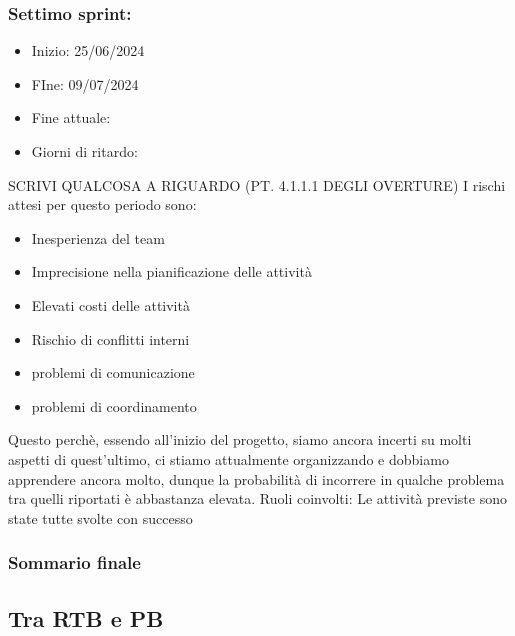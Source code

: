 \documentclass[italian,12pt]{article} %
\begin{document}
    \subsubsection{Settimo sprint:}
    \begin{itemize}
        \item Inizio: 25/06/2024
        \item FIne: 09/07/2024
        \item Fine attuale:
        \item Giorni di ritardo:
    \end{itemize}
    SCRIVI QUALCOSA A RIGUARDO (PT. 4.1.1.1 DEGLI OVERTURE)
    I rischi attesi per questo periodo sono:
    \begin{itemize}
        \item Inesperienza del team
        \item Imprecisione nella pianificazione delle attività
        \item Elevati costi delle attività
        \item Rischio di conflitti interni 
        \item problemi di comunicazione
        \item problemi di coordinamento
    \end{itemize}
    Questo perchè, essendo all’inizio del progetto, siamo ancora incerti su molti aspetti di quest’ultimo, ci stiamo attualmente organizzando e dobbiamo apprendere ancora molto, dunque la probabilità di incorrere in qualche problema tra quelli riportati è abbastanza elevata.
    Ruoli coinvolti: 
    Le attività previste sono state tutte svolte con successo

    \subsubsection{Sommario finale}

    \subsection{Tra RTB e PB}
\end{document}
